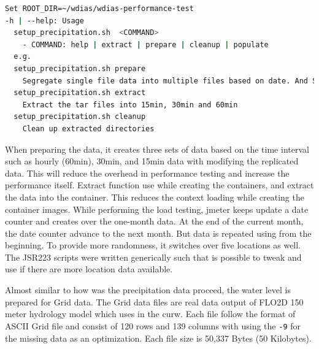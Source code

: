 \begin{lstlisting}[language=sh, caption=Preparation of precipitation data.]
Set ROOT_DIR=~/wdias/wdias-performance-test
-h | --help: Usage
  setup_precipitation.sh  <COMMAND>
    - COMMAND: help | extract | prepare | cleanup | populate
  e.g.
  setup_precipitation.sh prepare
    Segregate single file data into multiple files based on date. And Separate into main directories of 15min, 30min, 60min and create tar files
  setup_precipitation.sh extract
    Extract the tar files into 15min, 30min and 60min
  setup_precipitation.sh cleanup
    Clean up extracted directories
\end{lstlisting}
When preparing the data, it creates three sets of data based on the time interval such as hourly (60min), 30min, and 15min data with modifying the replicated data.
This will reduce the overhead in performance testing and increase the performance itself.
Extract function use while creating the containers, and extract the data into the container. This reduces the context loading while creating the container images.
While performing the load testing, \acrshort{jmeter} keeps update a date counter and creates over the one-month data. At the end of the current month, the date counter advance to the next month. But data is repeated using from the beginning. To provide more randomness, it switches over five locations as well. The JSR223 scripts were written generically such that is possible to tweak and use if there are more location data available.

Almost similar to how was the precipitation data proceed, the water level is prepared for Grid data. The Grid data files are real data output of FLO2D 150 meter hydrology model which uses in the \acrshort{curw}. Each file follow the format of ASCII Grid file and consist of 120 rows and 139 columns with using the \texttt{-9} for the missing data as an optimization. Each file size is 50,337 Bytes (50 Kilobytes).

